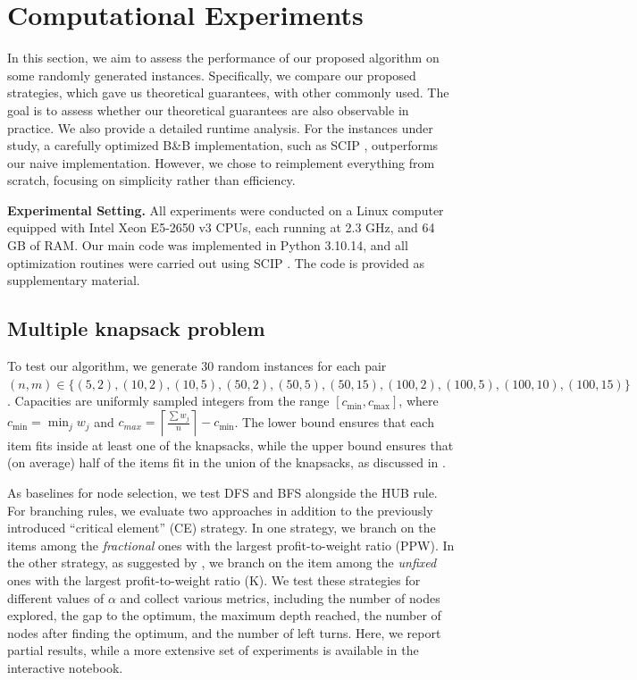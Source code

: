 \documentclass[moor,sglanonrev]{informs4}
\theoremstyle{plain}
\begin{document}
\section{Computational Experiments}\label{sec:comp_exp}
In this section, we aim to assess the performance of our proposed algorithm on some randomly generated instances. Specifically, we compare our proposed strategies, which gave us theoretical guarantees, with other commonly used. The goal is to assess whether our theoretical guarantees are also observable in practice. We also provide a detailed runtime analysis. For the instances under study, a carefully optimized B\&B implementation, such as SCIP \cite{scip}, outperforms our naive implementation. However, we chose to reimplement everything from scratch, focusing on simplicity rather than efficiency.

\textbf{Experimental Setting.} All experiments were conducted on a Linux computer equipped with Intel Xeon E5-2650 v3 CPUs, each running at 2.3 GHz, and 64 GB of RAM. Our main code was implemented in Python 3.10.14, and all optimization routines were carried out using SCIP \cite{scip}. The code is provided as supplementary material.

\subsection{Multiple knapsack problem}

To test our algorithm, we generate 30 random instances for each pair $(n, m) \in \{(5, 2), (10, 2), (10, 5), (50, 2), (50, 5), (50, 15), (100, 2), (100, 5), (100, 10), (100, 15)\}$. Capacities are uniformly sampled integers from the range $[c_{\min}, c_{\max}]$, where $c_{\min} = \min_{j}{w_j}$ and $c_{max} = \left\lceil \frac{\sum w_j}{n} \right\rceil - c_{\min}$. The lower bound ensures that each item fits inside at least one of the knapsacks, while the upper bound ensures that (on average) half of the items fit in the union of the knapsacks, as discussed in \cite{chvatal}.

As baselines for node selection, we test DFS and BFS alongside the HUB rule. For branching rules, we evaluate two approaches in addition to the previously introduced ``critical element'' (CE) strategy. In one strategy, we branch on the items among the \emph{fractional} ones with the largest profit-to-weight ratio (PPW). In the other strategy, as suggested by \cite{kolesar}, we branch on the item among the \emph{unfixed} ones with the largest profit-to-weight ratio (K).
%
We test these strategies for different values of $\alpha$ and collect various metrics, including the number of nodes explored, the gap to the optimum, the maximum depth reached, the number of nodes after finding the optimum, and the number of left turns.
%
Here, we report partial results, while a more extensive set of experiments is available in the interactive notebook. 
\end{document}
